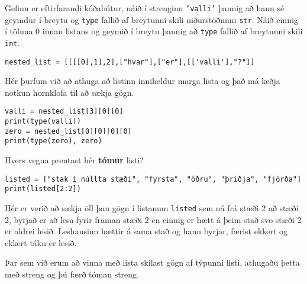 \begin{exercise}\label{lst4}
	Gefinn er eftirfarandi kóðabútur, náið í strenginn \texttt{'valli'} þannig að hann sé geymdur í breytu og \texttt{type} fallið af breytunni skili niðurstöðunni \texttt{str}.
	Náið einnig í töluna 0 innan listans og geymið í breytu þannig að \texttt{type} fallið af breytunni skili \texttt{int}. 
\begin{lstlisting}
nested_list = [[[[0],1],2],["hvar"],["er"],[['valli'],"?"]]\end{lstlisting}
\end{exercise}
\begin{Answer}[ref={lst4}]
Hér þurfum við að athuga að listinn inniheldur marga lista og það má keðja notkun hornklofa til að sækja gögn.
	\begin{lstlisting}
valli = nested_list[3][0][0]
print(type(valli))
zero = nested_list[0][0][0][0]
print(type(zero), zero)\end{lstlisting}
\end{Answer}

\begin{exercise}\label{lst5}
Hvers vegna prentast hér \textbf{tómur} listi? 
\begin{lstlisting}
listed = ["stak í núllta stæði", "fyrsta", "öðru", "þriðja", "fjórða"]
print(listed[2:2])\end{lstlisting}
\end{exercise}
\begin{Answer}[ref={lst5}]
Hér er verið að sækja öll þau gögn í listanum \texttt{listed} sem ná frá stæði 2 að stæði 2, byrjað er að lesa fyrir framan stæði 2 en einnig er hætt á þeim stað svo stæði 2 er aldrei lesið.
Leshausinn hættir á sama stað og hann byrjar, færist ekkert og ekkert tákn er lesið.

Þar sem við erum að vinna með lista skilast gögn af týpunni listi, athugaðu þetta með streng og þú færð tóman streng.
\end{Answer}

